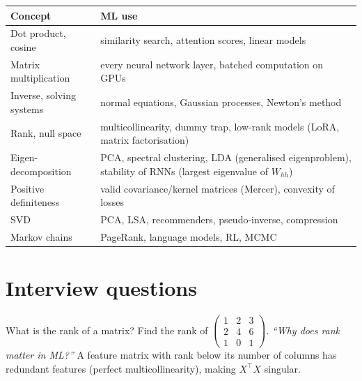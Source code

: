 \begin{practical}
\begin{center}\small
\begin{tabularx}{\linewidth}{l X}
\toprule
Concept & ML use\\
\midrule
Dot product, cosine & similarity search, attention scores, linear models\\
Matrix multiplication & every neural network layer, batched computation on GPUs\\
Inverse, solving systems & normal equations, Gaussian processes, Newton's method\\
Rank, null space & multicollinearity, dummy trap, low-rank models (LoRA, matrix factorisation)\\
Eigen-decomposition & PCA, spectral clustering, LDA (generalised eigenproblem), stability of RNNs (largest eigenvalue of $W_{hh}$)\\
Positive definiteness & valid covariance/kernel matrices (Mercer), convexity of losses\\
SVD & PCA, LSA, recommenders, pseudo-inverse, compression\\
Markov chains & PageRank, language models, RL, MCMC\\
\bottomrule
\end{tabularx}
\end{center}
\end{practical}

\section{Interview questions}

\begin{qa}{ What is the rank of a matrix? Find the rank of $\begin{pmatrix}1 & 2 & 3\\2 & 4 & 6\\1 & 0 & 1\end{pmatrix}$.}
\pushes \emph{``Why does rank matter in ML?''} A feature matrix with rank below its number of columns has redundant features (perfect multicollinearity), making $X^\top X$ singular.
\end{qa}

